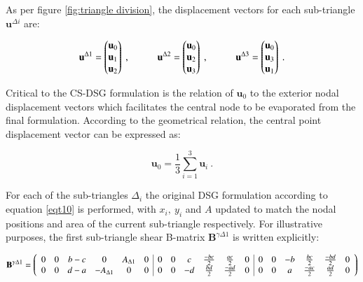 As per figure \ref{fig:triangle division}, the displacement vectors for each sub-triangle $\mathbf{u}^{\Delta i}$ are:

\begin{equation} 
\mathbf{u}^{\Delta 1} = 
\begin{pmatrix}
\mathbf{u}_0 \\
\mathbf{u}_1 \\
\mathbf{u}_2
\end{pmatrix}
\ ,
\hspace{10mm}
\mathbf{u}^{\Delta 2} = 
\begin{pmatrix}
\mathbf{u}_0 \\
\mathbf{u}_2 \\
\mathbf{u}_3
\end{pmatrix}
\ ,
\hspace{10mm}
\mathbf{u}^{\Delta 3} = 
\begin{pmatrix}
\mathbf{u}_0 \\
\mathbf{u}_3 \\
\mathbf{u}_1
\end{pmatrix}
\label{eqCSDSG1}\ .
\end{equation}

Critical to the CS-DSG formulation is the relation of $\mathbf{u}_0$ to the exterior nodal displacement vectors which facilitates the central node to be evaporated from the final formulation. According to the geometrical relation, the central point displacement vector can be expressed as:

 \begin{equation} 
\mathbf{u}_0
 =
 \frac{1}{3}
 \sum_{i=1}^3
\mathbf{u}_i
 \label{eqCSDSG2}\ .
 \end{equation}
 
 For each of the sub-triangles $\Delta_i$ the original DSG formulation according to equation \ref{eqt10} is performed, with $x_i,\ y_i$ and $A$ updated to match the nodal positions and area of the current sub-triangle respectively. For illustrative purposes, the first sub-triangle shear B-matrix $\mathbf{B}^{\gamma\Delta 1}$ is written explicitly:
 
\begin{equation}
	\delimitershortfall=0pt
	\mathbf{B}^{\gamma\Delta 1} = 
		\left(\begin{array}{cccccc|cccccc|cccccc}
			0 & 0 & b-c & 0 & A_{\Delta 1} & 0 & 0 & 0 & c & \frac{-bc}{2} & \frac{ac}{2} & 0 & 0 & 0 & -b & \frac{bc}{2} & \frac{-bd}{2} & 0 \\
			0 & 0 & d-a & -A_{\Delta 1} & 0 & 0 & 0 & 0 & -d & \frac{bd}{2} & \frac{-ad}{2} & 0 & 0 & 0 & a & \frac{-ac}{2} & \frac{ad}{2} & 0
		\end{array}
	\right)
	 \label{eqCSDSG3}
\end{equation}

